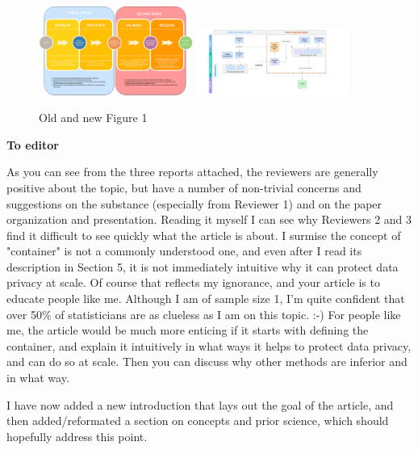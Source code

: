 \begin{figure}
\includegraphics[width=0.45\textwidth]{figs/SyntheticDataCycle.png}
\includegraphics[width=0.45\textwidth]{figs/SSB Flow.png}
\caption{\label{fig:comparision}Old and new Figure 1}
\end{figure}

\textbf{To editor} 

\begin{referee}
As you can see from the three reports attached,
the reviewers are generally positive about the topic, but have a number of non-trivial concerns and
suggestions on the substance (especially from Reviewer 1) and on the paper organization and
presentation. Reading it myself I can see why Reviewers 2 and 3 find it difficult to see quickly what the
article is about. I surmise the concept of "container" is not a commonly understood one, and even
after I read its description in Section 5, it is not immediately intuitive why it can protect data privacy at
scale. Of course that reflects my ignorance, and your article is to educate people like me. Although I
am of sample size 1, I'm quite confident that over 50\% of statisticians are as clueless as I am on this
topic. :-)
For people like me, the article would be much more enticing if it starts with defining the container,
and explain it intuitively in what ways it helps to protect data privacy, and can do so at scale. Then
you can discuss why other methods are inferior and in what way. 
\end{referee}

\begin{response}
    I have now added a new introduction that lays out the goal of the article, and then added/reformated a section on concepts and prior science, which should hopefully address this point.
\end{response}

